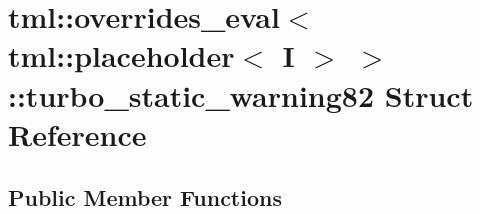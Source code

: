 \hypertarget{structtml_1_1overrides__eval_3_01tml_1_1placeholder_3_01I_01_4_01_4_1_1turbo__static__warning82}{\section{tml\+:\+:overrides\+\_\+eval$<$ tml\+:\+:placeholder$<$ I $>$ $>$\+:\+:turbo\+\_\+static\+\_\+warning82 Struct Reference}
\label{structtml_1_1overrides__eval_3_01tml_1_1placeholder_3_01I_01_4_01_4_1_1turbo__static__warning82}
}
\subsection*{Public Member Functions}
